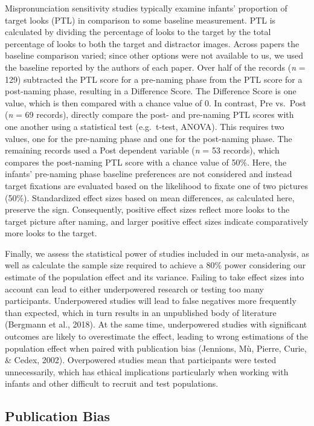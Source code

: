 \documentclass[man, noextraspace]{apa6}
\begin{document}
Mispronunciation sensitivity studies typically examine infants' proportion of target looks (PTL) in comparison to some baseline measurement. PTL is calculated by dividing the percentage of looks to the target by the total percentage of looks to both the target and distractor images. Across papers the baseline comparison varied; since other options were not available to us, we used the baseline reported by the authors of each paper. Over half of the records (\emph{n} = 129) subtracted the PTL score for a pre-naming phase from the PTL score for a post-naming phase, resulting in a Difference Score. The Difference Score is one value, which is then compared with a chance value of 0. In contrast, Pre vs.~Post (\emph{n} = 69 records), directly compare the post- and pre-naming PTL scores with one another using a statistical test (e.g.~t-test, ANOVA). This requires two values, one for the pre-naming phase and one for the post-naming phase. The remaining records used a Post dependent variable (\emph{n} = 53 records), which compares the post-naming PTL score with a chance value of 50\%. Here, the infants' pre-naming phase baseline preferences are not considered and instead target fixations are evaluated based on the likelihood to fixate one of two pictures (50\%). Standardized effect sizes based on mean differences, as calculated here, preserve the sign. Consequently, positive effect sizes reflect more looks to the target picture after naming, and larger positive effect sizes indicate comparatively more looks to the target.

Finally, we assess the statistical power of studies included in our meta-analysis, as well as calculate the sample size required to achieve a 80\% power considering our estimate of the population effect and its variance. Failing to take effect sizes into account can lead to either underpowered research or testing too many participants. Underpowered studies will lead to false negatives more frequently than expected, which in turn results in an unpublished body of literature (Bergmann et al., 2018). At the same time, underpowered studies with significant outcomes are likely to overestimate the effect, leading to wrong estimations of the population effect when paired with publication bias (Jennions, Mù, Pierre, Curie, \& Cedex, 2002). Overpowered studies mean that participants were tested unnecessarily, which has ethical implications particularly when working with infants and other difficult to recruit and test populations.

\hypertarget{publication-bias}{%
\subsection{Publication Bias}\label{publication-bias}}
\end{document}
